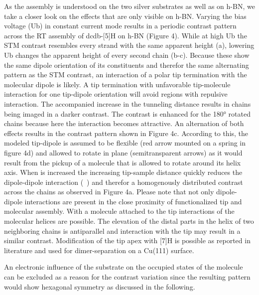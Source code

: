 As the assembly is understood on the two silver substrates as well as on h-BN, we take a closer look on the effects that are only visible on h-BN. Varying the bias voltage (Ub) in constant current mode results in a periodic contrast pattern across the RT assembly of dcdb-[5]H on h-BN (Figure 4). While at high Ub the STM contrast resembles every strand with the same apparent height (a), lowering Ub changes the apparent height of every second chain (b-c). Because these show the same dipole orientation of its constituents and therefor the same alternating pattern as the STM contrast, an interaction of a polar tip termination with the molecular dipole is likely. A tip termination with unfavorable tip-molecule interaction for one tip-dipole orientation will avoid regions with repulsive interaction. The accompanied increase in the tunneling distance results in chains being imaged in a darker contrast. The contrast is enhanced for the 180° rotated chains because here the interaction becomes attractive. An alternation of both effects results in the contrast pattern shown in Figure 4c. According to this, the modeled tip-dipole is assumed to be flexible (red arrow mounted on a spring in figure 4d) and allowed to rotate in plane (semitransparent arrows) as it would result from the pickup of a molecule that is allowed to rotate around its helix axis. When is increased the increasing tip-sample distance  quickly reduces the dipole-dipole interaction (~) and therefor a homogenously distributed contrast across the chains as observed in Figure 4a. Please note that not only dipole-dipole interactions are present in the close proximity of functionalized tip and molecular assembly. With a molecule attached to the tip  interactions of the molecular helices are possible. The elevation of the distal parts in the helix of two neighboring chains is antiparallel and interaction with the tip may result in a similar contrast. Modification of the tip apex with [7]H is possible as reported in literature\cite{} and used for dimer-separation on a Cu(111) surface.

An electronic influence of the substrate on the occupied states of the molecule can be excluded as a reason for the contrast variation since the resulting pattern would show hexagonal symmetry as discussed in the following.

